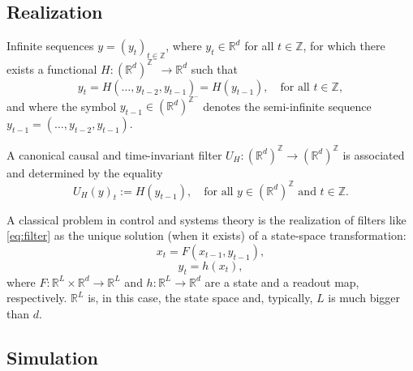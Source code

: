 \documentclass{article}
\newcounter{ct}
\begin{document}


\subsection{Realization}\label{sec:realization}
Infinite sequences \( y = (y_t)_{t \in \mathbb{Z}} \), where \( y_t \in \mathbb{R}^d \) for all \( t \in \mathbb{Z} \), for which there exists a functional \( H : (\mathbb{R}^d)^{\mathbb{Z}^-} \rightarrow \mathbb{R}^d \) such that 
\begin{equation}\label{eq:filter}
y_t = H(\ldots, y_{t-2}, y_{t-1}) = H\left( y_{t-1} \right), \quad \text{for all } t \in \mathbb{Z},
\end{equation}
and where the symbol \( y_{t-1} \in (\mathbb{R}^d)^{\mathbb{Z}^-} \) denotes the semi-infinite sequence \( y_{t-1} = (\ldots, y_{t-2}, y_{t-1}) \).

A canonical causal and time-invariant filter \( U_H : (\mathbb{R}^d)^{\mathbb{Z}} \rightarrow (\mathbb{R}^d)^{\mathbb{Z}} \) is associated and determined by the equality 
\[
U_H(y)_t := H\left( y_{t-1} \right), \quad \text{for all } y \in (\mathbb{R}^d)^{\mathbb{Z}} \text{ and } t \in \mathbb{Z}.
\]

A classical problem in control and systems theory is the realization of filters like \ref{eq:filter} as the unique solution (when it exists) of a state-space transformation:
\begin{equation}
x_t = F(x_{t-1}, y_{t-1}),
\end{equation}
\begin{equation}
y_t = h(x_t),
\end{equation}
where \( F : \mathbb{R}^L \times \mathbb{R}^d \rightarrow \mathbb{R}^L \) and \( h : \mathbb{R}^L \rightarrow \mathbb{R}^d \) are a state and a readout map, respectively. \( \mathbb{R}^L \) is, in this case, the state space and, typically, \( L \) is much bigger than \( d \).


\subsection{Simulation}\label{sec:simulation}
 \citep{sontag1992neural}
\end{document}
